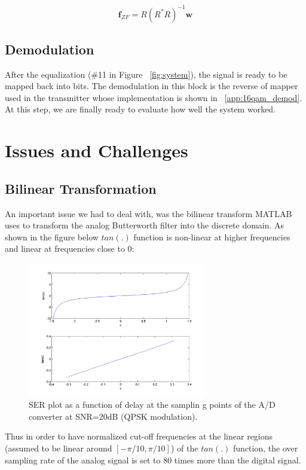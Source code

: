 \documentclass[]{article}
\begin{document}
\begin{equation}
\label{eq:zf} 
\mathbf{f}_{ZF} = R \left(R^{\ast}R \right)^{-1} \mathbf{w}
\end{equation}

\subsection{Demodulation}
\label{sec:demod}
After the equalization (\#11 in Figure ~\ref{fig:system}), the signal is ready to be mapped back into bits.  The demodulation in this block is the reverse of mapper used in the transmitter whose implementation is shown in ~\ref{app:16qam_demod}.  At this step, we are finally ready to evaluate how well the system worked.

\section{Issues and Challenges}
\label{sec:issues}

\subsection{Bilinear Transformation}
An important issue we had to deal with, was the bilinear transform MATLAB uses to transform the analog Butterworth filter into the discrete domain. As shown in the figure below $tan(.)$ function is non-linear at higher frequencies and linear at frequencies close to 0:

\begin{figure}[H]
\centering
\includegraphics[width=0.7\textwidth]{tan_graph.jpg}
\caption{SER plot as a function of delay at the samplin g points of the A/D converter at SNR=20dB (QPSK modulation). \label{fig:delay}}
\end{figure} 

Thus in order to have normalized cut-off frequencies at the linear regions (assumed to be linear around $\left[ -\pi/10,\pi/10 \right] $) of the $tan(.)$ function, the over sampling rate of the analog signal is set to 80 times more than the digital signal. \\
\end{document}
